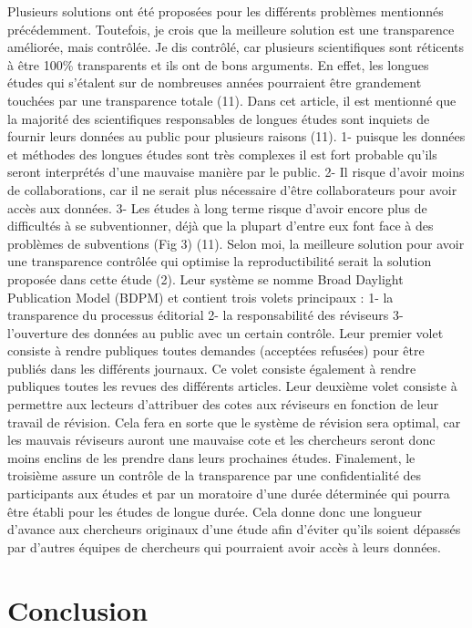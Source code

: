 \documentclass[9pt,twocolumn,twoside,]{pnas-new}
\begin{document}
Plusieurs solutions ont été proposées pour les différents problèmes
mentionnés précédemment. Toutefois, je crois que la meilleure solution
est une transparence améliorée, mais contrôlée. Je dis contrôlé, car
plusieurs scientifiques sont réticents à être 100\% transparents et ils
ont de bons arguments. En effet, les longues études qui s'étalent sur de
nombreuses années pourraient être grandement touchées par une
transparence totale (11). Dans cet article, il est mentionné que la
majorité des scientifiques responsables de longues études sont inquiets
de fournir leurs données au public pour plusieurs raisons (11). 1-
puisque les données et méthodes des longues études sont très complexes
il est fort probable qu'ils seront interprétés d'une mauvaise manière
par le public. 2- Il risque d'avoir moins de collaborations, car il ne
serait plus nécessaire d'être collaborateurs pour avoir accès aux
données. 3- Les études à long terme risque d'avoir encore plus de
difficultés à se subventionner, déjà que la plupart d'entre eux font
face à des problèmes de subventions (Fig 3) (11). Selon moi, la
meilleure solution pour avoir une transparence contrôlée qui optimise la
reproductibilité serait la solution proposée dans cette étude (2). Leur
système se nomme Broad Daylight Publication Model (BDPM) et contient
trois volets principaux : 1- la transparence du processus éditorial 2-
la responsabilité des réviseurs 3- l'ouverture des données au public
avec un certain contrôle. Leur premier volet consiste à rendre publiques
toutes demandes (acceptées refusées) pour être publiés dans les
différents journaux. Ce volet consiste également à rendre publiques
toutes les revues des différents articles. Leur deuxième volet consiste
à permettre aux lecteurs d'attribuer des cotes aux réviseurs en fonction
de leur travail de révision. Cela fera en sorte que le système de
révision sera optimal, car les mauvais réviseurs auront une mauvaise
cote et les chercheurs seront donc moins enclins de les prendre dans
leurs prochaines études. Finalement, le troisième assure un contrôle de
la transparence par une confidentialité des participants aux études et
par un moratoire d'une durée déterminée qui pourra être établi pour les
études de longue durée. Cela donne donc une longueur d'avance aux
chercheurs originaux d'une étude afin d'éviter qu'ils soient dépassés
par d'autres équipes de chercheurs qui pourraient avoir accès à leurs
données.

\hypertarget{conclusion}{%
\section*{Conclusion}\label{conclusion}}
\end{document}
